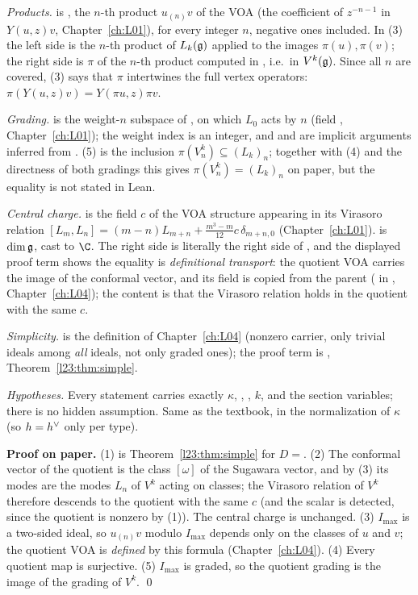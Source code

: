 \begin{dictionary}
\emph{Products.}  is , the $n$-th product $u_{(n)}v$ of the VOA  (the coefficient of
$z^{-n-1}$ in $Y(u,z)v$, Chapter~\ref{ch:L01}), for every integer $n$, negative ones included. In (3) the left side is the $n$-th product of $L_k(\mathfrak g)$
applied to the images $\pi(u),\pi(v)$; the right side is $\pi$ of the $n$-th product computed in , i.e.\ in
$V^k(\mathfrak g)$. Since all $n$ are covered, (3) says that
$\pi$ intertwines the full vertex operators: $\pi(Y(u,z)v)=Y(\pi u,z)\pi v$.

\emph{Grading.}  is the weight-$n$ subspace of , on which $L_0$ acts by $n$ (field , Chapter~\ref{ch:L01}); the weight
index is an integer, and  and  are implicit arguments inferred from . (5) is the inclusion
$\pi(V^k_n)\subseteq (L_k)_n$; together with (4) and the directness of both gradings this gives $\pi(V^k_n)=(L_k)_n$ on paper, but
the equality is not stated in Lean.

\emph{Central charge.}  is the field $c$ of the VOA structure appearing in its Virasoro relation
$[L_m,L_n]=(m-n)L_{m+n}+\frac{m^3-m}{12}c\,\delta_{m+n,0}$ (Chapter~\ref{ch:L01}).
 is $\dim\mathfrak g$, cast to $\C$. The right side is literally the right side of
, and the displayed proof term shows the equality is \emph{definitional transport}: the quotient
VOA carries the image of the conformal vector, and its  field is copied from the parent
( in , Chapter~\ref{ch:L04}); the content is that the Virasoro relation
holds in the quotient with the same $c$.

\emph{Simplicity.}  is the definition of Chapter~\ref{ch:L04} (nonzero carrier, only trivial ideals among \emph{all}
ideals, not only graded ones); the proof term is , Theorem~\ref{l23:thm:simple}.

\emph{Hypotheses.} Every statement carries exactly $\kappa$, , , $k$,  and the section variables;
there is no hidden assumption. Same as the textbook, in the normalization of $\kappa$ (so $h=h^\vee$ only per type).
\end{dictionary}

\textbf{Proof on paper.} (1) is Theorem~\ref{l23:thm:simple} for $D=$. (2) The conformal vector of the quotient is
the class $[\omega]$ of the Sugawara vector, and by (3) its modes are the modes $L_n$ of $V^k$ acting on classes; the Virasoro relation
of $V^k$ therefore descends to the quotient with the same $c$ (and the scalar is detected, since the quotient is nonzero by (1)). The
central charge is unchanged. (3) $I_{\max}$ is a two-sided
ideal, so $u_{(n)}v$ modulo $I_{\max}$ depends only on the classes of $u$ and $v$; the quotient VOA is \emph{defined} by this formula
(Chapter~\ref{ch:L04}). (4) Every quotient map is surjective. (5) $I_{\max}$ is graded, so the quotient grading is the image of the
grading of $V^k$. \qed

